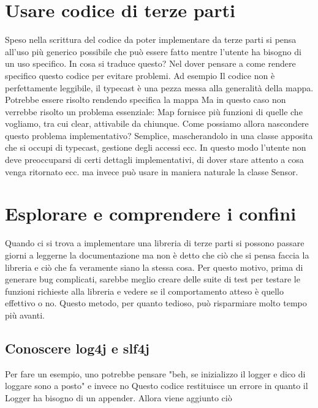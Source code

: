 \documentclass[11pt,a4paper]{book}
\begin{document}
\section{Usare codice di terze parti}
Speso nella scrittura del codice da poter implementare da terze parti si pensa all'uso più generico possibile che può essere fatto mentre l'utente ha bisogno di un uso specifico. In cosa si traduce questo? Nel dover pensare a come rendere specifico questo codice per evitare problemi. Ad esempio
\label{code: 046}
Il codice non è perfettamente leggibile, il typecast è una pezza messa alla generalità della mappa. Potrebbe essere risolto rendendo specifica la mappa
\label{code: 047}
Ma in questo caso non verrebbe risolto un problema essenziale: Map fornisce più funzioni di quelle che vogliamo, tra cui clear, attivabile da chiunque. Come possiamo allora nascondere questo problema implementativo? Semplice, mascherandolo in una classe apposita che si occupi di typecast, gestione degli accessi ecc.
\label{code: 048}
In questo modo l'utente non deve preoccuparsi di certi dettagli implementativi, di dover stare attento a cosa venga ritornato ecc. ma invece può usare in maniera naturale la classe Sensor.

\section{Esplorare e comprendere i confini}
Quando ci si trova a implementare una libreria di terze parti si possono passare giorni a leggerne la documentazione ma non è detto che ciò che si pensa faccia la libreria e ciò che fa veramente siano la stessa cosa. Per questo motivo, prima di generare bug complicati, sarebbe meglio creare delle suite di test per testare le funzioni richieste alla libreria e vedere se il comportamento atteso è quello effettivo o no. Questo metodo, per quanto tedioso, può risparmiare molto tempo più avanti.

\subsection{Conoscere log4j e slf4j}
Per fare un esempio, uno potrebbe pensare "beh, se inizializzo il logger e dico di loggare sono a posto" e invece no
\label{code: 049}
Questo codice restituisce un errore in quanto il Logger ha bisogno di un appender. Allora viene aggiunto ciò
\label{code: 050}
\end{document}
